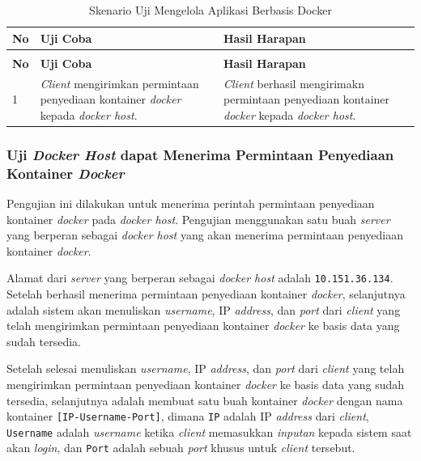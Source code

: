 \begin{longtable}{|p{}|p{}|p{}|}					\caption{Skenario Uji \textit{Client} dapat \textit{Login} Mengirimkan Permintaan Penyediaan Kontainer \textit{Docker}} \label{ujicoba2} \\
	\hline
	\textbf{No} & \textbf{Uji Coba} & \textbf{Hasil Harapan} \\ \hline
	\endfirsthead
	\caption[]{Skenario Uji Mengelola Aplikasi Berbasis Docker} \\
	\hline
	\textbf{No} & \textbf{Uji Coba} & \textbf{Hasil Harapan} \\ \hline
	\endhead
	\endfoot
	\endlastfoot
	
	1 & \textit{Client} mengirimkan permintaan penyediaan kontainer \textit{docker} kepada \textit{docker host}. & \textit{Client} berhasil mengirimakn permintaan penyediaan kontainer \textit{docker} kepada \textit{docker host}.\\ \hline
\end{longtable}

\subsubsection{Uji \textit{Docker Host} dapat Menerima Permintaan Penyediaan Kontainer \textit{Docker}}
Pengujian ini dilakukan untuk menerima perintah permintaan penyediaan kontainer \textit{docker} pada \textit{docker host}. Pengujian menggunakan satu buah \textit{server} yang berperan sebagai \textit{docker host} yang akan menerima permintaan penyediaan kontainer \textit{docker}.

Alamat dari \textit{server} yang berperan sebagai \textit{docker host} adalah \texttt{10.151.36.134}. Setelah berhasil menerima permintaan penyediaan kontainer \textit{docker}, selanjutnya adalah sistem akan menuliskan \textit{username}, IP \textit{address}, dan \textit{port} dari \textit{client} yang telah mengirimkan permintaan penyediaan kontainer \textit{docker} ke basis data yang sudah tersedia.

Setelah selesai menuliskan \textit{username}, IP \textit{address}, dan \textit{port} dari \textit{client} yang telah mengirimkan permintaan penyediaan kontainer \textit{docker} ke basis data yang sudah tersedia, selanjutnya adalah membuat satu buah kontainer \textit{docker} dengan nama kontainer \texttt{[IP-Username-Port]}, dimana \texttt{IP} adalah IP \textit{address} dari \textit{client}, \texttt{Username} adalah \textit{username} ketika \textit{client} memasukkan \textit{inputan} kepada sistem saat akan \textit{login}, dan \texttt{Port} adalah sebuah \textit{port} khusus untuk \textit{client} tersebut.

